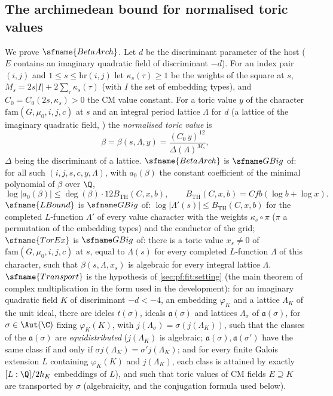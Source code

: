 \subsection{The archimedean bound for normalised toric values}\label{sec:pf:fit:betaarch}

We prove $\sfname{BetaArch}$. Let $d$ be the discriminant parameter of the host ($E$ contains an imaginary quadratic field of
discriminant $-d$). For an index pair $(i,j)$ and $1\le s\le\mathrm{hr}(i,j)$ let $\kappa_s(\tau)\ge1$ be the weights of the
square at $s$, $M_s=2s|I|+2\sum_\tau\kappa_s(\tau)$ (with $I$ the set of embedding types), and $C_0=C_0(2s,\kappa_s)>0$ the CM
value constant. For a toric value $y$ of the character $\mathrm{fam}(G,\mu_0,i,j,c)$ at $s$ and an integral period lattice
$\Lambda$ for $d$ (a lattice of the imaginary quadratic field, \cite{LeanSource2026}) the \emph{normalised toric value} is
\[
\beta=\beta(s,\Lambda,y)=\frac{(C_0\,y)^{12}}{\Delta(\Lambda)^{M_s}},
\]
$\Delta$ being the discriminant of a lattice. $\sfname{BetaArch}$ is $\fitGBig$ of: for all such $(i,j,s,c,y,\Lambda)$, with
$a_0(\beta)$ the constant coefficient of the minimal polynomial of $\beta$ over $\Q$,
\[
\log|a_0(\beta)|\le\deg(\beta)\cdot12B_{\mathrm{TH}}(C,x,b),\qquad B_{\mathrm{TH}}(C,x,b)=Cfb(\log b+\log x).
\]
$\sfname{LBound}$ is $\fitGBig$ of: $\log|\Lambda'(s)|\le B_{\mathrm{TH}}(C,x,b)$ for the completed $L$-function $\Lambda'$ of
every value character with the weights $\kappa_s\circ\pi$ ($\pi$ a permutation of the embedding types) and the conductor of the
grid; $\sfname{TorEx}$ is $\fitGBig$ of: there is a toric value $x_s\ne0$ of $\mathrm{fam}(G,\mu_0,i,j,c)$ at $s$, equal to
$\Lambda(s)$ for every completed $L$-function $\Lambda$ of this character, such that $\beta(s,\Lambda,x_s)$ is algebraic for every
integral lattice $\Lambda$. $\sfname{Transport}$ is the hypothesis of \cref{sec:pf:fit:setting} (the main theorem of complex
multiplication \cite{Shimura1971} in the form used in the development): for an imaginary quadratic field $K$ of discriminant
$-d<-4$, an embedding $\varphi_K$ and a lattice $\Lambda_K$ of the unit ideal, there are ideles $t(\sigma)$, ideals
$\mathfrak a(\sigma)$ and lattices $\Lambda_\sigma$ of $\mathfrak a(\sigma)$, for $\sigma\in\Aut(\C)$ fixing $\varphi_K(K)$,
with $j(\Lambda_\sigma)=\sigma(j(\Lambda_K))$, such that the classes of the $\mathfrak a(\sigma)$ are \emph{equidistributed}
($j(\Lambda_K)$ is algebraic; $\mathfrak a(\sigma),\mathfrak a(\sigma')$ have the same class if and only if $\sigma
j(\Lambda_K)=\sigma'j(\Lambda_K)$; and for every finite Galois extension $L$ containing $\varphi_K(K)$ and $j(\Lambda_K)$, each
class is attained by exactly $[L:\Q]/2h_K$ embeddings of $L$), and such that toric values of CM fields $E\supseteq K$ are
transported by $\sigma$ (algebraicity, and the conjugation formula used below).


